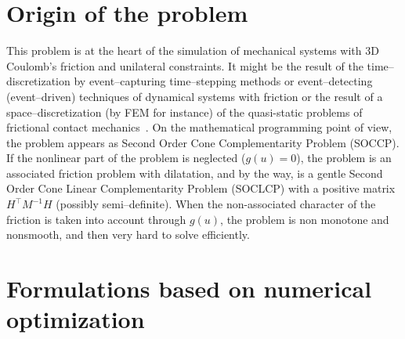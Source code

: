 \documentclass[11pt,a4paper]{article}
\begin{document}
\vspace{-0.5cm}\section{Origin of the problem}
  This problem is at the heart of the simulation of mechanical systems with 3D Coulomb's friction and unilateral constraints. It might be the result of the time--discretization by event--capturing time--stepping methods or event--detecting (event--driven) techniques of dynamical systems with friction or the result of a space--discretization (by FEM for instance) of the quasi-static problems of frictional contact mechanics~\cite{Acary.Cadoux2013}. On the mathematical programming point of view, the problem appears as Second Order Cone Complementarity Problem (SOCCP). If the nonlinear part of the problem is neglected ($g(u)=0$), the problem is an associated friction problem with dilatation, and by the way, is a gentle Second Order Cone Linear Complementarity Problem (SOCLCP) with a positive matrix $H^\top M^{-1} H$ (possibly semi--definite). When the non-associated character of the friction is taken into account through $g(u)$, the problem is non monotone and nonsmooth, and then very hard to solve efficiently.

\vspace{-0.6cm}\section{Formulations based on numerical optimization}
  
\end{document}
